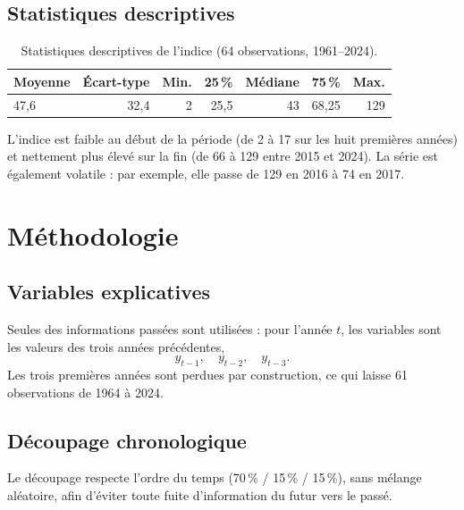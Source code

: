 \documentclass[11pt,a4paper]{article}
\begin{document}
\subsection{Statistiques descriptives}
\begin{table}[H]
\centering
\caption{Statistiques descriptives de l'indice (64 observations, 1961--2024).}
\begin{tabular}{lrrrrrr}
\toprule
Moyenne & Écart-type & Min. & 25\,\% & Médiane & 75\,\% & Max. \\
\midrule
47,6 & 32,4 & 2 & 25,5 & 43 & 68,25 & 129 \\
\bottomrule
\end{tabular}
\end{table}

L'indice est faible au début de la période (de 2 à 17 sur les huit premières années) et nettement plus élevé sur la fin (de 66 à 129 entre 2015 et 2024). La série est également volatile : par exemple, elle passe de 129 en 2016 à 74 en 2017.


\section{Méthodologie}

\subsection{Variables explicatives}
Seules des informations passées sont utilisées : pour l'année $t$, les variables sont les valeurs des trois années précédentes,
\[
y_{t-1},\quad y_{t-2},\quad y_{t-3}.
\]
Les trois premières années sont perdues par construction, ce qui laisse 61 observations de 1964 à 2024.

\subsection{Découpage chronologique}
Le découpage respecte l'ordre du temps (70\,\% / 15\,\% / 15\,\%), sans mélange aléatoire, afin d'éviter toute fuite d'information du futur vers le passé.
\end{document}
